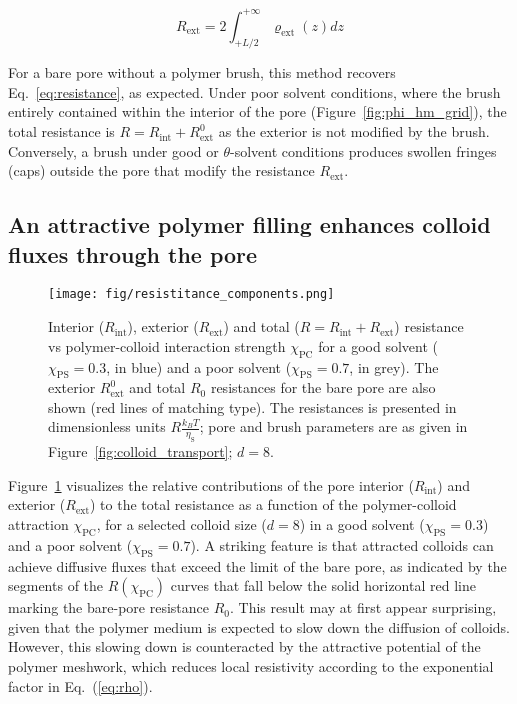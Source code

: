 \documentclass[12pt, a4paper]{article}
\begin{document}
\begin{equation}
   R_{\text{ext}} =2\int_{+L/2}^{+\infty}\varrho_{\text{ext}}(z)dz
    \label{R_ext}
\end{equation}

For a bare pore without a polymer brush, this method recovers Eq.~\ref{eq:resistance}, as expected.
Under poor solvent conditions, where the brush entirely contained within the interior of the pore (Figure~\ref{fig:phi_hm_grid}), the total resistance is $R = R_{\text{int}} + R_{\text{ext}}^{0}$ as the exterior is not modified by the brush.
Conversely, a brush under good or $\theta$-solvent conditions produces swollen fringes (caps) outside the pore that modify the resistance $R_{\text{ext}}$.


\subsection{An attractive polymer filling enhances colloid fluxes through the pore}

\begin{figure}
    \centering
    \texttt{[image: fig/resistitance\_components.png]}
    \caption{
    Interior ($R_{\text{int}}$), exterior ($R_{\text{ext}}$) and total ($R = R_{\text{int}} + R_{\text{ext}}$) resistance  vs polymer-colloid interaction strength $\chi_{\text{PC}}$ for a good solvent ($\chi_{\text{PS}} = 0.3$, in blue) and a poor solvent ($\chi_{\text{PS}} = 0.7$, in grey).
    The exterior $R_{\text{ext}}^{0}$ and total $R_0$ resistances for the bare pore are also shown (red lines of matching type).  
    The resistances is presented in dimensionless units $R\tfrac{k_{B}T}{\eta_{\text{S}}}$; pore and brush parameters are as given in Figure~\ref{fig:colloid_transport}; $d = 8$.
    }
    \label{fig:resistivity_profile}
\end{figure}

Figure~\ref{fig:resistivity_profile} visualizes the relative contributions of the pore interior ($R_{\text{int}}$) and exterior ($R_{\text{ext}}$) to the total resistance as a function of the polymer-colloid attraction $\chi_\text{PC}$,
for a selected colloid size ($d = 8$) in a good solvent ($\chi_\text{PS} = 0.3$) and a poor solvent ($\chi_\text{PS} = 0.7$).
A striking feature is that attracted colloids can achieve diffusive fluxes that exceed the limit of the bare pore, as indicated by the segments of the $R(\chi_{\text{PC}})$ curves that fall below the solid horizontal red line marking the bare-pore resistance $R_{0}$.
This result may at first appear surprising, given that the polymer medium is expected to slow down the diffusion of colloids.
However, this slowing down is counteracted by the attractive potential of the polymer meshwork, which reduces local resistivity according to the exponential factor in Eq.~(\ref{eq:rho}).
\end{document}
